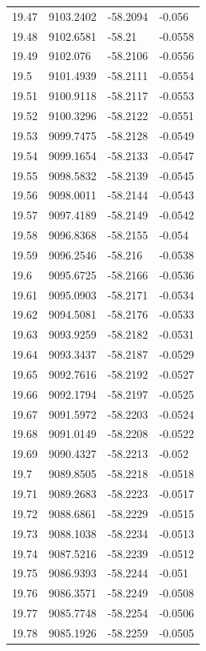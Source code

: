 \begin{table}[H]
\begin{tabular}{llll}
19.47 & 9103.2402 & -58.2094 & -0.056 \\
19.48 & 9102.6581 & -58.21 & -0.0558 \\
19.49 & 9102.076 & -58.2106 & -0.0556 \\
19.5 & 9101.4939 & -58.2111 & -0.0554 \\
19.51 & 9100.9118 & -58.2117 & -0.0553 \\
19.52 & 9100.3296 & -58.2122 & -0.0551 \\
19.53 & 9099.7475 & -58.2128 & -0.0549 \\
19.54 & 9099.1654 & -58.2133 & -0.0547 \\
19.55 & 9098.5832 & -58.2139 & -0.0545 \\
19.56 & 9098.0011 & -58.2144 & -0.0543 \\
19.57 & 9097.4189 & -58.2149 & -0.0542 \\
19.58 & 9096.8368 & -58.2155 & -0.054 \\
19.59 & 9096.2546 & -58.216 & -0.0538 \\
19.6 & 9095.6725 & -58.2166 & -0.0536 \\
19.61 & 9095.0903 & -58.2171 & -0.0534 \\
19.62 & 9094.5081 & -58.2176 & -0.0533 \\
19.63 & 9093.9259 & -58.2182 & -0.0531 \\
19.64 & 9093.3437 & -58.2187 & -0.0529 \\
19.65 & 9092.7616 & -58.2192 & -0.0527 \\
19.66 & 9092.1794 & -58.2197 & -0.0525 \\
19.67 & 9091.5972 & -58.2203 & -0.0524 \\
19.68 & 9091.0149 & -58.2208 & -0.0522 \\
19.69 & 9090.4327 & -58.2213 & -0.052 \\
19.7 & 9089.8505 & -58.2218 & -0.0518 \\
19.71 & 9089.2683 & -58.2223 & -0.0517 \\
19.72 & 9088.6861 & -58.2229 & -0.0515 \\
19.73 & 9088.1038 & -58.2234 & -0.0513 \\
19.74 & 9087.5216 & -58.2239 & -0.0512 \\
19.75 & 9086.9393 & -58.2244 & -0.051 \\
19.76 & 9086.3571 & -58.2249 & -0.0508 \\
19.77 & 9085.7748 & -58.2254 & -0.0506 \\
19.78 & 9085.1926 & -58.2259 & -0.0505 \\

\end{tabular}
\end{table}
